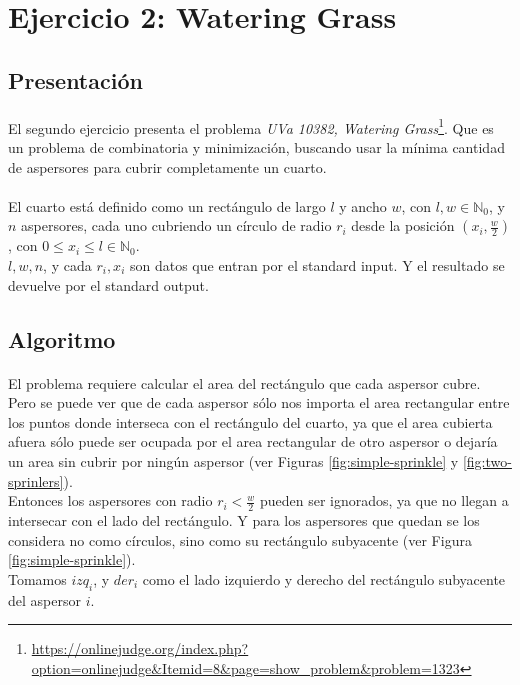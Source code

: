 \documentclass[./main.tex]{subfiles}
\begin{document}
\section{Ejercicio 2: Watering Grass}
\label{sec:ej2}

\subsection{Presentación}
\label{sec:ej2-intro}

\paragraph{} El segundo ejercicio presenta el problema \textit{UVa 10382, Watering Grass}\footnote{\url{https://onlinejudge.org/index.php?option=onlinejudge&Itemid=8&page=show_problem&problem=1323}}. Que es un problema de combinatoria y minimización, buscando usar la mínima cantidad de aspersores para cubrir completamente un cuarto.

\paragraph{} El cuarto está definido como un rectángulo de largo \(l\) y ancho \(w\), con \(l, w \in \mathbb{N}_0\), y \(n\) aspersores, cada uno cubriendo un círculo de radio \(r_i\) desde la posición \((x_i, \frac{w}{2})\), con \(0 \leq x_i \leq l \in \mathbb{N}_0\). \\
\(l, w, n\), y cada \(r_i, x_i\) son datos que entran por el standard input. Y el resultado se devuelve por el standard output.

\subsection{Algoritmo}
\label{sec:ej2-algo}

\paragraph{} El problema requiere calcular el area del rectángulo que cada aspersor cubre. Pero se puede ver que de cada aspersor sólo nos importa el area rectangular entre los puntos donde interseca con el rectángulo del cuarto, ya que el area cubierta afuera sólo puede ser ocupada por el area rectangular de otro aspersor o dejaría un area sin cubrir por ningún aspersor (ver Figuras \ref{fig:simple-sprinkle} y \ref{fig:two-sprinlers}). \\
\indent Entonces los aspersores con radio \(r_i < \frac{w}{2}\) pueden ser ignorados, ya que no llegan a intersecar con el lado del rectángulo. Y para los aspersores que quedan se los considera no como círculos, sino como su rectángulo subyacente (ver Figura \ref{fig:simple-sprinkle}). \\
Tomamos \(izq_i\), y \(der_i\) como el lado izquierdo y derecho del rectángulo subyacente del aspersor \(i\).
\end{document}
